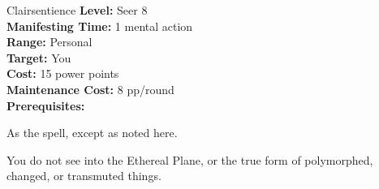 {Clairsentience}
{
	\textbf{Level:}
	Seer 8\\
	\textbf{Manifesting Time:}
	1 mental action\\
	\textbf{Range:}
	Personal\\
	\textbf{Target:}
	You\\
	\textbf{Cost:}
	15 power points\\
	\textbf{Maintenance Cost:}
	8 pp/round\\
	\textbf{Prerequisites:}
	\\
}
{
	As the  spell, except as noted here.

	You do not see into the Ethereal Plane, or the true form of polymorphed, changed, or transmuted things.
}